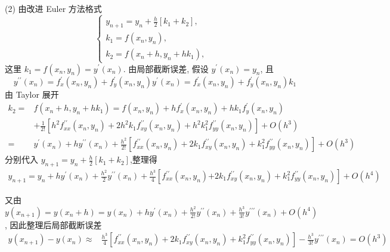 \begin{tcolorbox}[enhanced,colback=8,colframe=7,breakable,coltitle=green!25!black,title=2024]
(2) 由改进 Euler 方法格式
$$
\left\{\begin{array}{ll}
y_{n+1}=y_{n}+\frac{h}{2}\left[k_{1}+k_{2}\right], \\
k_{1}=f\left(x_{n}, y_{n}\right), & \\
k_{2}=f\left(x_{n}+h, y_{n}+h k_{1}\right), &
\end{array}\right.
$$
这里 $ k_{1}=f\left(x_{n}, y_{n}\right)=y^{\prime}\left(x_{n}\right) $. 由局部截断误差, 假设 $ y^{\prime}\left(x_{n}\right)=y_{n} $, 且
$$
y^{\prime \prime}\left(x_{n}\right)=f_{x}^{\prime}\left(x_{n}, y_{n}\right)+f_{y}^{\prime}\left(x_{n}, y_{n}\right) y^{\prime}\left(x_{n}\right)=f_{x}^{\prime}\left(x_{n}, y_{n}\right)+f_{y}^{\prime}\left(x_{n}, y_{n}\right) k_{1}
$$
由 Taylor 展开
$$
\begin{aligned}
k_{2}=&f\left(x_{n}+h, y_{n}+h k_{1}\right)=f\left(x_{n}, y_{n}\right)+h f_{x}^{\prime}\left(x_{n}, y_{n}\right)+h k_{1} f_{y}^{\prime}\left(x_{n}, y_{n}\right)\\
& +\frac{1}{2!}\left[h^{2} f_{x x}^{\prime \prime}\left(x_{n}, y_{n}\right)+2 h^{2} k_{1} f_{x y}^{\prime \prime}\left(x_{n}, y_{n}\right)+h^{2} k_{1}^{2} f_{y y}^{\prime \prime}\left(x_{n}, y_{n}\right)\right]+O\left(h^{3}\right) \\
= & y^{\prime}\left(x_{n}\right)+h y^{\prime \prime}\left(x_{n}\right)+\frac{h^{2}}{2!}\left[f_{x x}^{\prime \prime}\left(x_{n}, y_{n}\right)+2 k_{1} f_{x y}^{\prime \prime}\left(x_{n}, y_{n}\right)+k_{1}^{2} f_{y y}^{\prime \prime}\left(x_{n}, y_{n}\right)\right]+O\left(h^{3}\right)
\end{aligned}
$$
分别代入 $y_{n+1}=  y_{n}+\frac{h}{2}\left[k_{1}+k_{2}\right]$,整理得
$$
\begin{aligned}
y_{n+1}=  y_{n}+h y^{\prime}\left(x_{n}\right)+\frac{h^{2}}{2} y^{\prime \prime}\left(x_{n}\right)+\frac{h^{3}}{4}\left[f_{x x}^{\prime \prime}\left(x_{n}, y_{n}\right)\right.  \left.+2 k_{1} f_{x y}^{\prime \prime}\left(x_{n}, y_{n}\right)+k_{1}^{2} f_{y y}^{\prime \prime}\left(x_{n}, y_{n}\right)\right]+O\left(h^{4}\right)
\end{aligned}
$$

又由 $ y\left(x_{n+1}\right)=y\left(x_{n}+h\right)=y\left(x_{n}\right)+h y^{\prime}\left(x_{n}\right)+\frac{h^{2}}{2!} y^{\prime \prime}\left(x_{n}\right)+\frac{h^{3}}{3!} y^{\prime \prime \prime}\left(x_{n}\right)+O\left(h^{4}\right) $, 因此整理后局部截断误差
$$
\begin{aligned}
y\left(x_{n+1}\right)-y\left(x_{n}\right) \approx & \frac{h^{3}}{4}\left[f_{x x}^{\prime \prime}\left(x_{n}, y_{n}\right)+2 k_{1} f_{x y}^{\prime \prime}\left(x_{n}, y_{n}\right)+k_{1}^{2} f_{y y}^{\prime \prime}\left(x_{n}, y_{n}\right)\right]-\frac{h^{3}}{3!} y^{\prime \prime \prime}\left(x_{n}\right)=O\left(h^{3}\right)
\end{aligned}
$$
 \end{tcolorbox}
 
